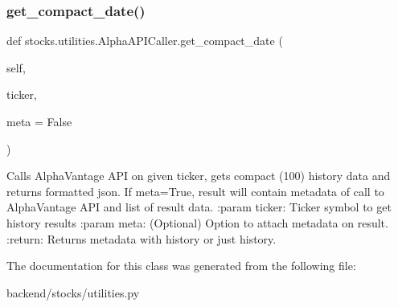 \subsubsection{\texorpdfstring{get\+\_\+compact\+\_\+date()}{get\_compact\_date()}}
{\footnotesize\ttfamily def stocks.\+utilities.\+Alpha\+A\+P\+I\+Caller.\+get\+\_\+compact\+\_\+date (\begin{DoxyParamCaption}\item[{}]{self,  }\item[{}]{ticker,  }\item[{}]{meta = {\ttfamily False} }\end{DoxyParamCaption})}

\begin{DoxyVerb}Calls AlphaVantage API on given ticker, gets compact (100) history data
and returns formatted json. If meta=True, result will contain metadata
of call to AlphaVantage API and list of result data.
:param ticker: Ticker symbol to get history results
:param meta: (Optional) Option to attach metadata on result.
:return: Returns metadata with history or just history.
\end{DoxyVerb}
 

The documentation for this class was generated from the following file\+:\begin{DoxyCompactItemize}
\item 
backend/stocks/utilities.\+py\end{DoxyCompactItemize}
